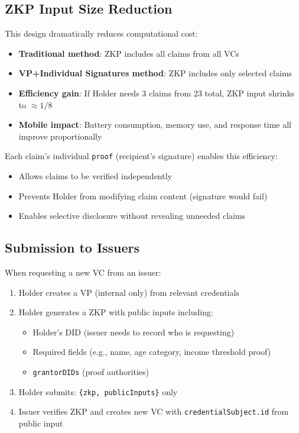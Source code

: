 \subsection{ZKP Input Size Reduction}

This design dramatically reduces computational cost:

\begin{itemize}
  \item \textbf{Traditional method}: ZKP includes all claims from all VCs
  \item \textbf{VP+Individual Signatures method}: ZKP includes only selected claims
  \item \textbf{Efficiency gain}: If Holder needs 3 claims from 23 total, ZKP input shrinks to $\approx 1/8$
  \item \textbf{Mobile impact}: Battery consumption, memory use, and response time all improve proportionally
\end{itemize}

Each claim's individual \texttt{proof} (recipient's signature) enables this efficiency:

\begin{itemize}
  \item Allows claims to be verified independently
  \item Prevents Holder from modifying claim content (signature would fail)
  \item Enables selective disclosure without revealing unneeded claims
\end{itemize}

\subsection{Submission to Issuers}

When requesting a new VC from an issuer:

\begin{enumerate}
  \item Holder creates a VP (internal only) from relevant credentials
  \item Holder generates a ZKP with public inputs including:
    \begin{itemize}
      \item Holder's DID (issuer needs to record who is requesting)
      \item Required fields (e.g., name, age category, income threshold proof)
      \item \texttt{grantorDIDs} (proof authorities)
    \end{itemize}
  \item Holder submits: \texttt{\{zkp, publicInputs\}} only
  \item Issuer verifies ZKP and creates new VC with \texttt{credentialSubject.id} from public input
\end{enumerate}

